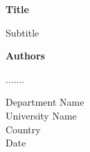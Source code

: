 \begin{titlepage}
   \begin{center}
       \vspace*{1cm}

       \Huge
       \textbf{Title}

       \vspace{0.5cm}
        Subtitle
            
       \vspace{1.5cm}

       \textbf{Authors}

       \vfill
            
       .......
            
       \vspace{0.8cm}

       Department Name\\
       University Name\\
       Country\\
       Date
            
   \end{center}
\end{titlepage}